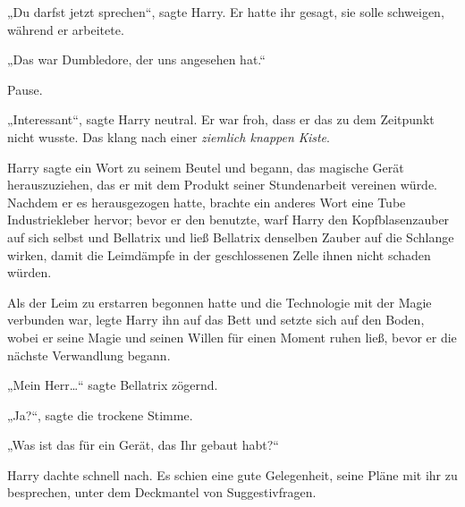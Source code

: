 „Du darfst jetzt sprechen“, sagte Harry. Er hatte ihr gesagt, sie solle schweigen, während er arbeitete.

„Das war Dumbledore, der uns angesehen hat.“

Pause.

„Interessant“, sagte Harry neutral. Er war froh, dass er das zu dem Zeitpunkt nicht wusste. Das klang nach einer \emph{ziemlich knappen Kiste}.

Harry sagte ein Wort zu seinem Beutel und begann, das magische Gerät herauszuziehen, das er mit dem Produkt seiner Stundenarbeit vereinen würde. Nachdem er es herausgezogen hatte, brachte ein anderes Wort eine Tube Industriekleber hervor; bevor er den benutzte, warf Harry den Kopfblasenzauber auf sich selbst und Bellatrix und ließ Bellatrix denselben Zauber auf die Schlange wirken, damit die Leimdämpfe in der geschlossenen Zelle ihnen nicht schaden würden.

Als der Leim zu erstarren begonnen hatte und die Technologie mit der Magie verbunden war, legte Harry ihn auf das Bett und setzte sich auf den Boden, wobei er seine Magie und seinen Willen für einen Moment ruhen ließ, bevor er die nächste Verwandlung begann.

„Mein Herr…“ sagte Bellatrix zögernd.

„Ja?“, sagte die trockene Stimme.

„Was ist das für ein Gerät, das Ihr gebaut habt?“

Harry dachte schnell nach. Es schien eine gute Gelegenheit, seine Pläne mit ihr zu besprechen, unter dem Deckmantel von Suggestivfragen.

